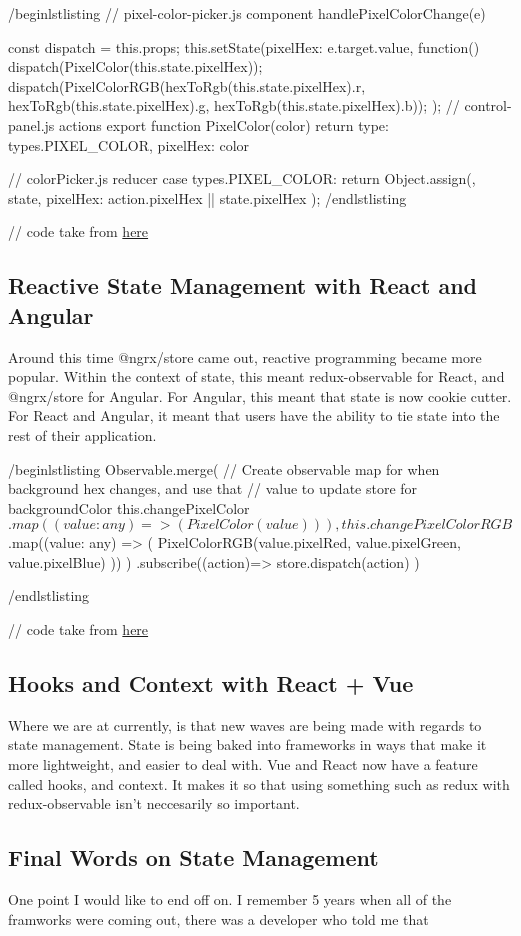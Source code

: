 /begin{lstlisting}
// pixel-color-picker.js component
handlePixelColorChange(e){
    const {dispatch} = this.props;
    this.setState({pixelHex: e.target.value}, function(){
        dispatch(PixelColor(this.state.pixelHex));
        dispatch(PixelColorRGB(hexToRgb(this.state.pixelHex).r, hexToRgb(this.state.pixelHex).g, hexToRgb(this.state.pixelHex).b));
    });
// control-panel.js actions
export function PixelColor(color){
  return{
    type: types.PIXEL\_COLOR,
    pixelHex: color
  }
}

// colorPicker.js reducer
case types.PIXEL\_COLOR:
  return Object.assign({}, state, {
    pixelHex: action.pixelHex || state.pixelHex
  });
/end{lstlisting}

// code take from \href{https://github.com/CharlieGreenman/pixelLight}{here}

\subsection{ Reactive State Management with React and Angular }
Around this time @ngrx/store came out, reactive programming became more popular.
Within the context of state, this meant redux-observable for React, and
@ngrx/store for Angular. For Angular, this meant that state is now cookie
cutter. For React and Angular, it meant that users have the ability to tie state into the
rest of their application.

/begin{lstlisting}
Observable.merge(
  // Create observable map for  when background hex changes, and use that
  // value to update store for backgroundColor
  this.changePixelColor$.map((value: any) => (
    PixelColor(value)
  )),
  this.changePixelColorRGB$.map((value: any) => (
    PixelColorRGB(value.pixelRed, value.pixelGreen,
      value.pixelBlue)
  ))
)
.subscribe((action)=>{
  store.dispatch(action)
})
}
/end{lstlisting}

// code take from \href{https://github.com/CharlieGreenman/angularPixel_illustrator}{here}

\subsection{ Hooks and Context with React + Vue }
Where we are at currently, is that new waves are being made with regards to
state management. State is being baked into frameworks in ways that make it
more lightweight, and easier to deal with. Vue and React now have a feature
called hooks, and context. It makes it so that using something such as redux
with redux-observable isn't neccesarily so important.

\subsection{ Final Words on State Management }
One point I would like to end off on. I remember 5 years when all of the
framworks were coming out, there was a developer who told me that
